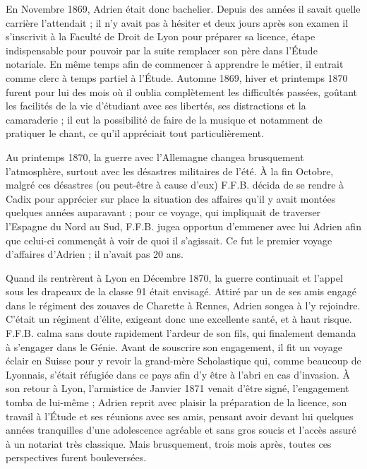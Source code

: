 \documentclass[11pt,a4paper]{report}
\begin{document}
En Novembre 1869, Adrien était donc bachelier. Depuis des années il savait quelle carrière l'attendait ; il n'y avait pas à hésiter et deux jours après son examen il s'inscrivit à la Faculté de Droit de Lyon pour préparer sa licence, étape indispensable pour pouvoir par la suite remplacer son père dans l'Étude notariale. En même temps afin de commencer à apprendre le métier, il entrait comme clerc à temps partiel à l'Étude. Automne 1869, hiver et printemps 1870 furent pour lui des mois où il oublia complètement les difficultés passées, goûtant les facilités de la vie d'étudiant avec ses libertés, ses distractions et la camaraderie ; il eut la possibilité de faire de la musique et notamment de pratiquer le chant, ce qu'il appréciait tout particulièrement.


Au printemps 1870, la guerre avec l'Allemagne changea brusquement l'atmosphère, surtout avec les désastres militaires de l'été. À la fin Octobre, malgré ces désastres (ou peut-être à cause d'eux) F.F.B. décida de se rendre à Cadix pour apprécier sur place la situation des affaires qu'il y avait montées quelques années auparavant ; pour ce voyage, qui impliquait de traverser l'Espagne du Nord au Sud, F.F.B. jugea opportun d'emmener avec lui Adrien afin que celui-ci commençât à voir de quoi il s'agissait. Ce fut le premier voyage d'affaires d'Adrien ; il n'avait pas 20 ans.

Quand ils rentrèrent à Lyon en Décembre 1870, la guerre continuait et l'appel sous les drapeaux de la classe 91 était envisagé. Attiré par un de ses amis engagé dans le régiment des zouaves de Charette à Rennes, Adrien songea à l'y rejoindre. C'était un régiment d'élite, exigeant donc une excellente santé, et à haut risque. F.F.B. calma sans doute rapidement l'ardeur de son fils, qui finalement demanda à s'engager dans le Génie. Avant de souscrire son engagement, il fit un voyage éclair en Suisse pour y revoir la grand-mère Scholastique qui, comme beaucoup de Lyonnais, s'était réfugiée dans ce pays afin d'y être à l'abri en cas d'invasion. À son retour à Lyon, l'armistice de Janvier 1871 venait d'être signé, l'engagement tomba de lui-même ; Adrien reprit avec plaisir la préparation de la licence, son travail à l'Étude et ses réunions avec ses amis, pensant avoir devant lui quelques années tranquilles d'une adolescence agréable et sans gros soucis et l'accès assuré à un notariat très classique. Mais brusquement, trois mois après, toutes ces perspectives furent bouleversées.
\end{document}

